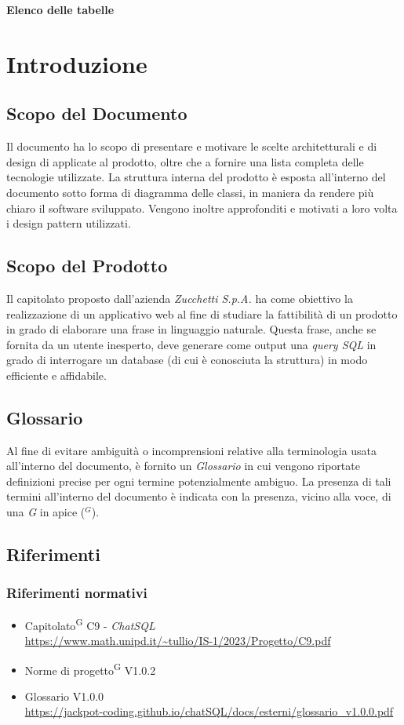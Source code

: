 \documentclass[5pt]{article}
\begin{document}
	\pagebreak
	\textbf{\Large Elenco delle tabelle} \\
	\makeatletter
	\makeatother
	\pagebreak
	
	\section{Introduzione}
	
	\subsection{Scopo del Documento}

    Il documento ha lo scopo di presentare e motivare le scelte architetturali e di design di applicate al prodotto, oltre che a fornire una lista completa delle tecnologie utilizzate. La struttura interna del prodotto è esposta all'interno del documento sotto forma di diagramma delle classi, in maniera da rendere più chiaro il software sviluppato. Vengono inoltre approfonditi e motivati a loro volta i design pattern utilizzati. 
	
	\subsection{Scopo del Prodotto}
    Il capitolato proposto dall'azienda \textit{Zucchetti S.p.A.} ha come obiettivo la realizzazione di un applicativo web al fine di studiare la fattibilità di un prodotto in grado di elaborare una frase in linguaggio naturale. Questa frase, anche se fornita da un utente inesperto, deve generare come output una \textit{query SQL} in grado di interrogare un database (di cui è conosciuta la struttura) in modo efficiente e affidabile.
	
	\subsection{Glossario}
    Al fine di evitare ambiguità o incomprensioni relative alla terminologia usata all'interno del documento, è fornito un \textit{Glossario} in cui vengono riportate definizioni precise per ogni termine potenzialmente ambiguo. La presenza di tali termini all'interno del documento è indicata con la presenza, vicino alla voce, di una \textit{G} in apice ($^G$). 
	\subsection{Riferimenti}
	\subsubsection{Riferimenti normativi}
	\begin{itemize}
		\item Capitolato\textsuperscript{G} C9 - \textit{ChatSQL} \\ \url{https://www.math.unipd.it/~tullio/IS-1/2023/Progetto/C9.pdf}
		\item Norme di progetto\textsuperscript{G} V1.0.2
		\item Glossario V1.0.0 \\
		\url{https://jackpot-coding.github.io/chatSQL/docs/esterni/glossario_v1.0.0.pdf}
	\end{itemize}
\end{document}
